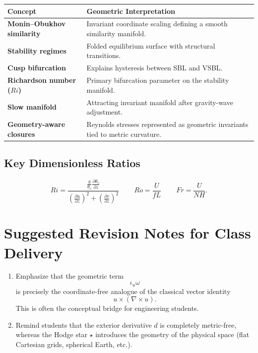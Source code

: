 \documentclass[11pt]{article}
\begin{document}
\begin{longtable}{>{\bfseries}p{}p{}}
Concept & Geometric Interpretation\\
\midrule

Monin--Obukhov similarity &
Invariant coordinate scaling defining a smooth similarity manifold.\\

Stability regimes &
Folded equilibrium surface with structural transitions.\\

Cusp bifurcation &
Explains hysteresis between SBL and VSBL.\\

Richardson number ($Ri$) &
Primary bifurcation parameter on the stability manifold.\\

Slow manifold &
Attracting invariant manifold after gravity-wave adjustment.\\

Geometry-aware closures &
Reynolds stresses represented as geometric invariants tied to metric curvature.
\end{longtable}

\subsection*{Key Dimensionless Ratios}

\[
Ri
=
\frac{
\frac{g}{\theta_v}
\frac{\partial\theta_v}{\partial z}
}{
\left(\frac{\partial u}{\partial z}\right)^2
+
\left(\frac{\partial v}{\partial z}\right)^2
}\,
\qquad
Ro=\frac{U}{fL}\,
\qquad
Fr=\frac{U}{NH}.
\]

\section*{Suggested Revision Notes for Class Delivery}

\begin{enumerate}
\item
Emphasize that the geometric term
\[
\iota_u\omega
\]
is precisely the coordinate-free analogue of the classical vector identity
\[
u\times(\nabla\times u).
\]
This is often the conceptual bridge for engineering students.

\item
Remind students that the exterior derivative $d$ is completely metric-free,
whereas the Hodge star $\star$ introduces the geometry of the physical
space (flat Cartesian grids, spherical Earth, etc.).
\end{enumerate}
\end{document}
